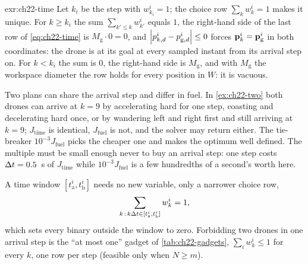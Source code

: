 \begin{solution}{exr:ch22-time}
Let $k_i$ be the step with $w^i_{k_i} = 1$; the choice row
$\sum_k w^i_k = 1$ makes it unique. For $k \ge k_i$ the sum
$\sum_{k' \le k} w^i_{k'}$ equals $1$, the right-hand side of the last row
of \cref{eq:ch22-time} is $M_{\mathrm{g}} \cdot 0 = 0$, and
$\left\lvert p^i_{k,d} - p^i_{\mathrm{g},d} \right\rvert \le 0$ forces $\mathbf{p}^i_k =
\mathbf{p}^i_{\mathrm{g}}$ in both coordinates: the drone is at its goal at every
sampled instant from its arrival step on. For $k < k_i$ the sum is $0$, the
right-hand side is $M_{\mathrm{g}}$, and with $M_{\mathrm{g}}$ the
workspace diameter the row holds for every position in $W$: it is vacuous.

Two plans can share the arrival step and differ in fuel. In
\cref{ex:ch22-two} both drones can arrive at $k = 9$ by accelerating hard
for one step, coasting and decelerating hard once, or by wandering left and
right first and still arriving at $k = 9$; $J_{\mathrm{time}}$ is
identical, $J_{\mathrm{fuel}}$ is not, and the solver may return either.
The tie-breaker $10^{-3} J_{\mathrm{fuel}}$ picks the cheaper one and makes
the optimum well defined. The multiple must be small enough never to buy an
arrival step: one step costs $\Delta t = 0.5$~s of $J_{\mathrm{time}}$ while
$10^{-3} J_{\mathrm{fuel}}$ is a few hundredths of a second's worth here.

A time window $[t^i_{\mathrm{a}}, t^i_{\mathrm{b}}]$ needs no new variable,
only a narrower choice row,
\begin{equation*}
  \sum_{k \,:\, k\Delta t \in [t^i_{\mathrm{a}}, t^i_{\mathrm{b}}]} w^i_k = 1,
\end{equation*}
which sets every binary outside the window to zero. Forbidding two drones
in one arrival step is the ``at most one'' gadget of
\cref{tab:ch22-gadgets}, $\sum_i w^i_k \le 1$ for every $k$, one row per
step (feasible only when $N \ge m$).
\end{solution}

